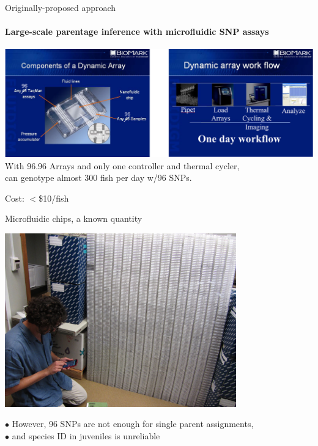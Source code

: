 \documentclass[letter,graphicx]{beamer}
\begin{document}
\begin{frame}{Originally-proposed approach}
\framesubtitle{Large-scale parentage inference with microfluidic SNP assays}
\begin{center}
\mbox{}\hspace*{-.10\textwidth}
\includegraphics[width=1.16\textwidth]{figs/fluidigm.png}\\
With 96.96 Arrays and only one controller and thermal cycler, \\
can genotype almost 300 fish per day w/96 SNPs.

Cost: $<$\$10/fish 
\end{center}
\end{frame}








\begin{frame}{Microfluidic chips, a known quantity}
\begin{center}
\includegraphics[width=0.75\textwidth]{figs/AC_calculating_chipwall.jpg}
\end{center}
$\bullet$ However, 96 SNPs are not enough for single parent assignments,\\
$\bullet$ and species ID in juveniles is unreliable
\end{frame}
\end{document}
